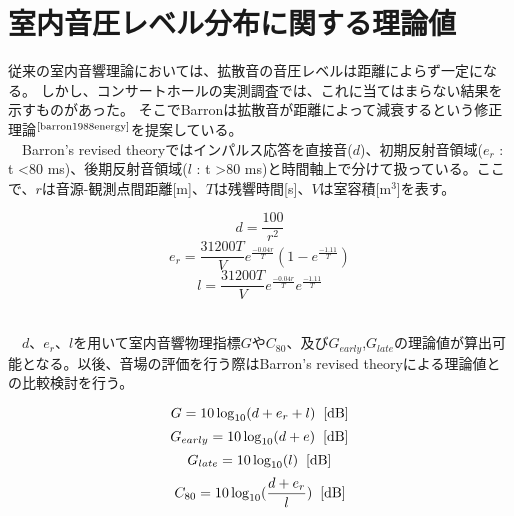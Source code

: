 \section{室内音圧レベル分布に関する理論値}
従来の室内音響理論においては、拡散音の音圧レベルは距離によらず一定になる。
しかし、コンサートホールの実測調査では、これに当てはまらない結果を示すものがあった。
そこでBarronは拡散音が距離によって減衰するという修正理論$^{\text{\cite{barron1988energy}}}$を提案している。
\\　Barron's revised theoryではインパルス応答を直接音($d$)、初期反射音領域($e_r$ : t \textless 80 ms)、後期反射音領域($l$ : t \textgreater 80 ms)と時間軸上で分けて扱っている。ここで、$r$は音源-観測点間距離[m]、$T$は残響時間[s]、$V$は室容積[m$^3$]を表す。
\begin{table}[htbp]
    \begin{equation}
        \label{eq:d}
        d=\frac{100}{r^2}
    \end{equation}
    \begin{equation}
        e_r=\frac{31200T}{V}e^{\frac{-0.04r}{T}}(1-e^{\frac{-1.11}{T}})
    \end{equation}
    \begin{equation}
        l=\frac{31200T}{V}e^{\frac{-0.04r}{T}}e^{\frac{-1.11}{T}}
    \end{equation}
\end{table}
\\　$d$、$e_r$、$l$を用いて室内音響物理指標$G$や$C_{80}$、及び$G_{early}$,$G_{late}$の理論値が算出可能となる。以後、音場の評価を行う際はBarron's revised theoryによる理論値との比較検討を行う。
\begin{table}[htbp]
    \begin{equation}
        G=10\log_{10}(d+e_r+l)\hspace{2mm}\textrm{[dB]}
    \end{equation}
    \begin{equation}
        G_{early}=10\log_{10}(d+e)\hspace{2mm}\textrm{[dB]}
    \end{equation}
    \begin{equation}
        G_{late}=10\log_{10}(l)\hspace{2mm}\textrm{[dB]}
    \end{equation}
    \begin{equation}
        C_{80}=10\log_{10}(\frac{d+e_r}{l})\hspace{2mm}\textrm{[dB]}
    \end{equation}

\end{table}